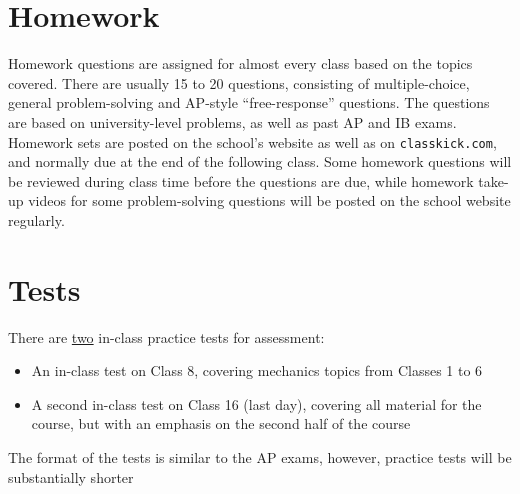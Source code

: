 \documentclass{../../oss-handout}
\begin{document}
\section{Homework}
Homework questions are assigned for almost every class based on the topics
covered. There are usually 15 to 20 questions, consisting of multiple-choice,
general problem-solving and AP-style ``free-response'' questions. The questions
are based on university-level problems, as well as past AP and IB exams.
Homework sets are posted on the school's website as well as on
\texttt{classkick.com}, and normally due at the end of the following class.
Some homework questions will be reviewed during class time before the questions
are due, while homework take-up videos for some problem-solving questions will
be posted on the school website regularly.


\section{Tests}
There are \underline{two} in-class practice tests for assessment:
\begin{itemize}[nosep]
\item An in-class test on Class 8, covering mechanics topics from Classes 1 to 6
\item A second in-class test on Class 16 (last day), covering all material for
  the course, but with an emphasis on the second half of the course
\end{itemize}
The format of the tests is similar to the AP exams, however, practice tests
will be substantially shorter
\end{document}
